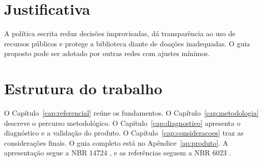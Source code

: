 \section{Justificativa}

A política escrita reduz decisões improvisadas, dá transparência ao uso de recursos públicos e protege a biblioteca diante de doações inadequadas. O guia proposto pode ser adotado por outras redes com ajustes mínimos.

\section{Estrutura do trabalho}
O Capítulo~\ref{cap:referencial} reúne os fundamentos. O Capítulo~\ref{cap:metodologia} descreve o percurso metodológico. O Capítulo~\ref{cap:diagnostico} apresenta o diagnóstico e a validação do produto. O Capítulo~\ref{cap:consideracoes} traz as considerações finais. O guia completo está no Apêndice~\ref{ap:produto}. A apresentação segue a NBR 14724 \cite{NBR14724:2011}, e as referências seguem a NBR 6023 \cite{NBR6023:2018}.
